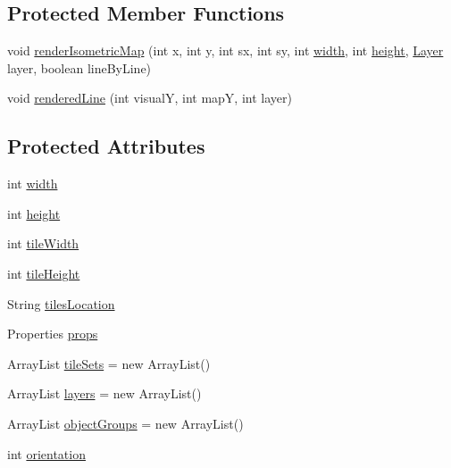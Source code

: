 \subsection*{Protected Member Functions}
\begin{DoxyCompactItemize}
\item 
void \mbox{\hyperlink{classorg_1_1newdawn_1_1slick_1_1tiled_1_1_tiled_map_a325186ad96c5d26d7565e166ff1a66dd}{render\+Isometric\+Map}} (int x, int y, int sx, int sy, int \mbox{\hyperlink{classorg_1_1newdawn_1_1slick_1_1tiled_1_1_tiled_map_a13b00efd90dfee0ccc7474310e40199e}{width}}, int \mbox{\hyperlink{classorg_1_1newdawn_1_1slick_1_1tiled_1_1_tiled_map_a5f9af8e6eb820e35327c4290d14c0bd7}{height}}, \mbox{\hyperlink{classorg_1_1newdawn_1_1slick_1_1tiled_1_1_layer}{Layer}} layer, boolean line\+By\+Line)
\item 
void \mbox{\hyperlink{classorg_1_1newdawn_1_1slick_1_1tiled_1_1_tiled_map_acf9160a21ea260cfce93e14567252781}{rendered\+Line}} (int visualY, int mapY, int layer)
\end{DoxyCompactItemize}
\subsection*{Protected Attributes}
\begin{DoxyCompactItemize}
\item 
int \mbox{\hyperlink{classorg_1_1newdawn_1_1slick_1_1tiled_1_1_tiled_map_a13b00efd90dfee0ccc7474310e40199e}{width}}
\item 
int \mbox{\hyperlink{classorg_1_1newdawn_1_1slick_1_1tiled_1_1_tiled_map_a5f9af8e6eb820e35327c4290d14c0bd7}{height}}
\item 
int \mbox{\hyperlink{classorg_1_1newdawn_1_1slick_1_1tiled_1_1_tiled_map_a35bfb6f4f23b344d4ad3f9bda198093e}{tile\+Width}}
\item 
int \mbox{\hyperlink{classorg_1_1newdawn_1_1slick_1_1tiled_1_1_tiled_map_aa521f50d236247a335994bba33b0baa7}{tile\+Height}}
\item 
String \mbox{\hyperlink{classorg_1_1newdawn_1_1slick_1_1tiled_1_1_tiled_map_ad72e470aa9510074aae12dab7968ec1f}{tiles\+Location}}
\item 
Properties \mbox{\hyperlink{classorg_1_1newdawn_1_1slick_1_1tiled_1_1_tiled_map_ace934059dd995f4bda5f4c1534df9d30}{props}}
\item 
Array\+List \mbox{\hyperlink{classorg_1_1newdawn_1_1slick_1_1tiled_1_1_tiled_map_a4fd72e23a7aaf6f85905f4bf78e2ce5f}{tile\+Sets}} = new Array\+List()
\item 
Array\+List \mbox{\hyperlink{classorg_1_1newdawn_1_1slick_1_1tiled_1_1_tiled_map_a33061324d017a4cd8f41d04e0c60ac27}{layers}} = new Array\+List()
\item 
Array\+List \mbox{\hyperlink{classorg_1_1newdawn_1_1slick_1_1tiled_1_1_tiled_map_aa446ef4b07ea80ab5f112e8512ed7561}{object\+Groups}} = new Array\+List()
\item 
int \mbox{\hyperlink{classorg_1_1newdawn_1_1slick_1_1tiled_1_1_tiled_map_a2985b80667928eae97e82ecad9e4432c}{orientation}}
\end{DoxyCompactItemize}
